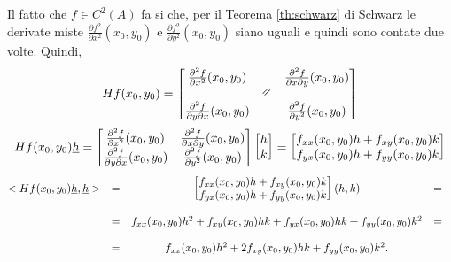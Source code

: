 Il fatto che $f\in C^2(A)$ fa si che, per il Teorema \ref{th:schwarz} di Schwarz le derivate miste $\frac{\partial f^2}{\partial x^2} (x_0,y_0)$ e $\frac{\partial f^2}{\partial y^2} (x_0,y_0)$ siano uguali e quindi sono contate due volte. Quindi,
\begin{equation*}
	Hf(x_0,y_0) =
	\begin{bmatrix}
		\frac{\partial^2 f}{\partial x^2}(x_0,y_0) && \frac{\partial ^2 f}{\partial x\partial y}(x_0,y_0)\\
		&\horeq&\\
		\frac{\partial ^2 f}{\partial y\partial x}(x_0,y_0) && \frac{\partial^2 f}{\partial y^2}(x_0,y_0)
	\end{bmatrix}
\end{equation*}
\begin{equation*}
	Hf(x_0,y_0)\uline h =
	\begin{bmatrix}
		\frac{\partial^2 f}{\partial x^2}(x_0,y_0) & \frac{\partial ^2 f}{\partial x\partial y}(x_0,y_0)\\
		\frac{\partial ^2 f}{\partial y\partial x}(x_0,y_0) & \frac{\partial^2 f}{\partial y^2}(x_0,y_0)
	\end{bmatrix}
	\begin{bmatrix}
		h\\
		k
	\end{bmatrix} = 
	\begin{bmatrix}
		f_{xx}(x_0,y_0)h + f_{xy}(x_0,y_0)k\\
		f_{yx}(x_0,y_0)h +  f_{yy}(x_0,y_0)k
	\end{bmatrix}
\end{equation*}
\begin{equation*}
	\begin{matrix}
		<Hf(x_0,y_0)\uline h, \uline h> &=&
		\begin{bmatrix}
			f_{xx}(x_0,y_0)h + f_{xy}(x_0,y_0)k\\
			f_{yx}(x_0,y_0)h +  f_{yy}(x_0,y_0)k
		\end{bmatrix} (h,k) &=&\\\\
		&=& f_{xx}(x_0,y_0)h^2 + f_{xy}(x_0,y_0)hk + f_{yx}(x_0,y_0)hk +  f_{yy}(x_0,y_0)k ^2 &=&\\\\
		&=& f_{xx}(x_0,y_0)h^2 + 2 f_{xy}(x_0,y_0)hk +  f_{yy}(x_0,y_0)k ^2.
	\end{matrix}
\end{equation*}

